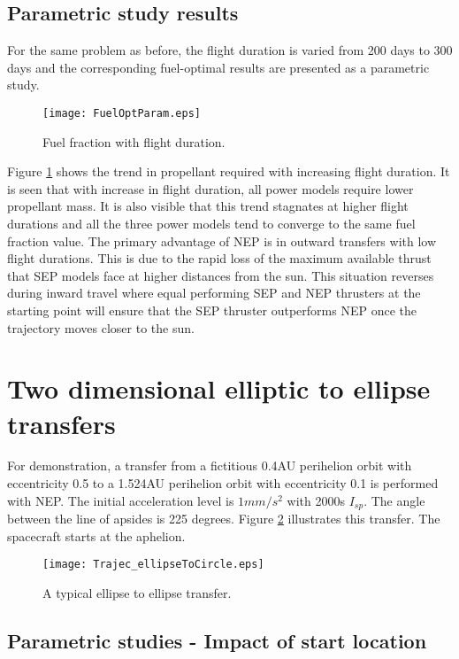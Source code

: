 \subsection{Parametric study results}
For the same problem as before, the flight duration is varied from 200 days to 300 days and the corresponding fuel-optimal results are presented as a parametric study.
\begin{figure}[H]
	\centering\texttt{[image: FuelOptParam.eps]}
	\caption{Fuel fraction with flight duration.}
	\label{sc_fueloptparam}
\end{figure}
Figure \ref{sc_fueloptparam} shows the trend in propellant required with increasing flight duration. It is seen that with increase in flight duration, all power models require lower propellant mass. It is also visible that this trend stagnates at higher flight durations and all the three power models tend to converge to the same fuel fraction value. The primary advantage of NEP is in outward transfers with low flight durations. This is due to the rapid loss of the maximum available thrust that SEP models face at higher distances from the sun. This situation reverses during inward travel where equal performing SEP and NEP thrusters at the starting point will ensure that the SEP thruster outperforms NEP once the trajectory moves closer to the sun.
\section{Two dimensional elliptic to ellipse transfers}
For demonstration, a transfer from a fictitious 0.4AU perihelion orbit with eccentricity 0.5 to a 1.524AU perihelion orbit with eccentricity 0.1 is performed with NEP. The initial acceleration level is $1mm/s^2$ with 2000s $I_{sp}$. The angle between the line of apsides is 225 degrees. Figure \ref{ellipse-to-ellipse} illustrates this transfer. The spacecraft starts at the aphelion.
\begin{figure}[H]
	\centering\texttt{[image: Trajec\_ellipseToCircle.eps]}
	\caption{A typical ellipse to ellipse transfer.}
	\label{ellipse-to-ellipse}
\end{figure}
\subsection{Parametric studies - Impact of start location}
